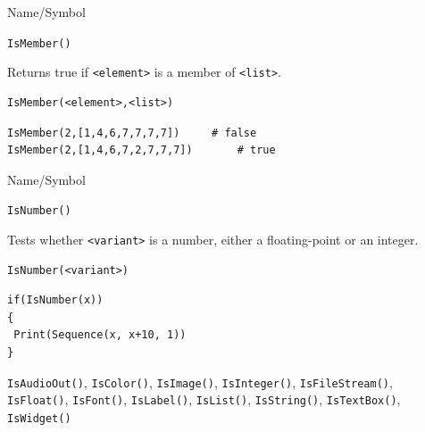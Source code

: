 \begin{desc}{Name/Symbol}
\item[Name/Symbol]	\verb+IsMember()+

\item[Description]	Returns true if \verb+<element>+ is a member of \verb+<list>+.

\item[Usage]		
\begin{verbatim}
IsMember(<element>,<list>)
\end{verbatim}

\item[Example]	
\begin{verbatim}
IsMember(2,[1,4,6,7,7,7,7])		# false
IsMember(2,[1,4,6,7,2,7,7,7]) 		# true
\end{verbatim}

\item[See Also]	
\end{desc}

\begin{desc}{Name/Symbol}
\item[Name/Symbol]	\verb+IsNumber()+

\item[Description]	Tests whether \verb+<variant>+ is a number, either a
		floating-point or an integer.

\item[Usage]		
\begin{verbatim}
IsNumber(<variant>)
\end{verbatim}

\item[Example]	
\begin{verbatim}
if(IsNumber(x))
{
 Print(Sequence(x, x+10, 1))
}
\end{verbatim}

\item[See Also] \verb+IsAudioOut()+, \verb+IsColor()+,
  \verb+IsImage()+, \verb+IsInteger()+, \verb+IsFileStream()+,
  \verb+IsFloat()+, \verb+IsFont()+, \verb+IsLabel()+,
  \verb+IsList()+, \verb+IsString()+, \verb+IsTextBox()+,
  \verb+IsWidget()+
\end{desc}

